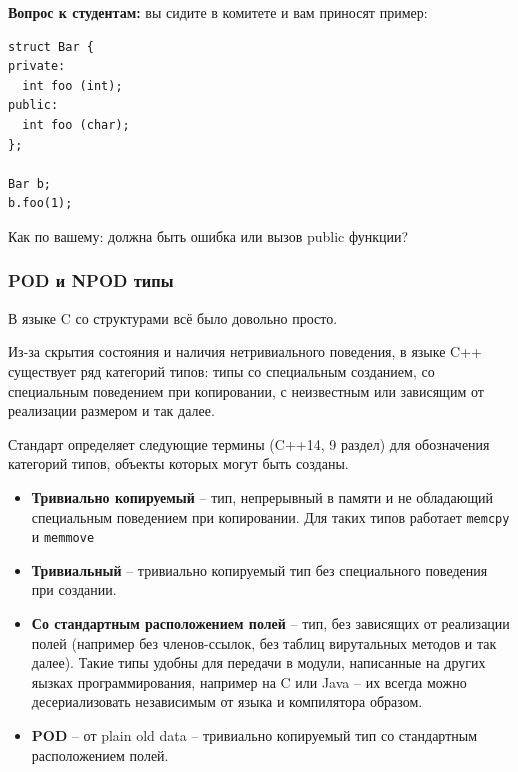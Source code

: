 \documentclass[a4paper,12pt,oneside]{article}
\newif\ifanswers
\begin{document}
\ifanswers
Правильный ответ: поле всё-таки инкапсулировано лучше, чем если просто торчит наружу. Например у него не может утечь адрес. Метод, который полностью вскрывает инкапсуляцию будет выглядеть так:

\begin{lstlisting}
public:
  int& color() { return color_; } // bad idea
\end{lstlisting}

и даже такой метод иногда имеет смысл оставить в классе (контроль доступа, логгирование, удобство отладки, вот это всё).
\fi

\textbf{Вопрос к студентам:} вы сидите в комитете и вам приносят пример:

\begin{lstlisting}
struct Bar {
private:
  int foo (int);
public:
  int foo (char);
};

Bar b;
b.foo(1);
\end{lstlisting}

Как по вашему: должна быть ошибка или вызов public функции?

\ifanswers
Правильный ответ: де-факто здесь будет ошибка. И это можно обосновать: представьте, вы решили закрыть доступ для некоего метода. Вы конечно хотели бы, чтобы во всех местах, где вы его использовали, была ошибка, но если по месту использования он может просто связаться с другой перегрузкой, её не будет.
\fi

\subsubsection{POD и NPOD типы}\label{PodNpod}

В языке C со структурами всё было довольно просто.

Из-за скрытия состояния и наличия нетривиального поведения, в языке C++ существует ряд категорий типов: типы со специальным созданием, со специальным поведением при копировании, с неизвестным или зависящим от реализации размером и так далее.

Стандарт определяет следующие термины (C++14, 9 раздел) для обозначения категорий типов, объекты которых могут быть созданы.

\begin{itemize}
\item \textbf{Тривиально копируемый} -- тип, непрерывный в памяти и не обладающий специальным поведением при копировании. Для таких типов работает \lstinline!memcpy! и \lstinline!memmove! 
\item \textbf{Тривиальный} -- тривиально копируемый тип без специального поведения при создании.
\item \textbf{Со стандартным расположением полей} -- тип, без зависящих от реализации полей (например без членов-ссылок, без таблиц вирутальных методов и так далее). Такие типы удобны для передачи в модули, написанные на других яызках программирования, например на C или Java -- их всегда можно десериализовать независимым от языка и компилятора образом.
\item \textbf{POD} -- от plain old data -- тривиально копируемый тип со стандартным расположением полей.
\end{itemize}
\end{document}
